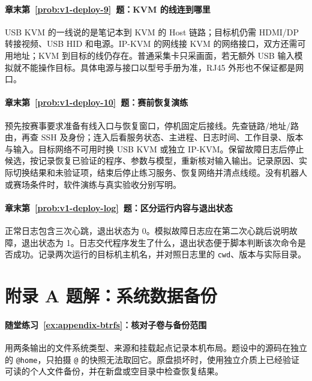 \paragraph*{章末第~\ref{prob:v1-deploy-9}~题：KVM 的线连到哪里}
\begin{solution}
USB KVM 的一线说的是笔记本到 KVM 的 Host 链路；目标机仍需 HDMI/DP 转接视频、USB HID 和电源。IP-KVM 的网线接 KVM 的网络接口，双方还需可用地址；KVM 到目标的线仍存在。普通采集卡只采画面，若无额外 USB 输入模拟就不能操作目标。具体电源与接口以型号手册为准，RJ45 外形也不保证都是网口。
\end{solution}

\paragraph*{章末第~\ref{prob:v1-deploy-10}~题：赛前恢复演练}
\begin{solution}
预先按赛事要求准备有线入口与恢复窗口，停机固定后接线。先查链路/地址/路由，再查 SSH 及身份；连入后看服务状态、主进程、日志时间、工作目录、版本与输入。目标网络不可用时换 USB KVM 或独立 IP-KVM。保留故障日志后停止候选，按记录恢复已验证的程序、参数与模型，重新核对输入输出。记录原因、实际切换结果和未验证项，结束后停止练习服务、恢复网络并清点线缆。没有机器人或赛场条件时，软件演练与真实验收分别写明。
\end{solution}

\paragraph*{章末第~\ref{prob:v1-deploy-log}~题：区分运行内容与退出状态}
\begin{solution}
正常日志包含三次心跳，退出状态为 0。模拟故障日志应在第二次心跳后说明故障，退出状态为 1。日志交代程序发生了什么，退出状态便于脚本判断该次命令是否成功。记录两次运行的目标机主机名，并对照日志里的 \texttt{cwd}、版本与实际目录。
\end{solution}

\section*{附录 A 题解：系统数据备份}
{}

\paragraph*{随堂练习~\ref{ex:appendix-btrfs}：核对子卷与备份范围}
\begin{solution}
用两条输出的文件系统类型、来源和挂载起点记录本机布局。题设中的源码在独立的 \texttt{@home}，只拍摄 \texttt{@} 的快照无法取回它。原盘损坏时，使用独立介质上已经验证可读的个人文件备份，并在新盘或空目录中检查恢复结果。
\end{solution}

